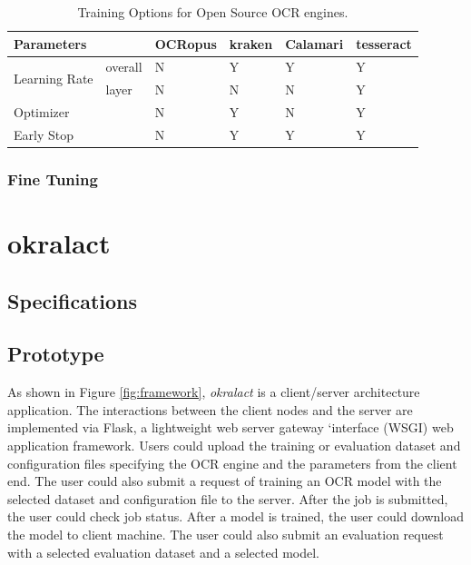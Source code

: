 \documentclass[conference]{IEEEtran}
\begin{document}
\begin{table}[bt]
\begin{tabular}{llllll}
\hline
Parameters & & OCRopus     & kraken                      & Calamari & tesseract\\ \hline
\multirow{2}{*}{Learning Rate}& overall & N & Y & Y & Y\\ 
&layer & N & N  & N & Y \\
\hline
Optimizer &  &  N & Y & N & Y \\\hline
Early Stop & & N & Y & Y & Y \\\hline
\end{tabular}
\caption{Training Options for Open Source OCR engines.}
\label{tab:training_options}
\end{table}
\subsubsection*{Fine Tuning}
\section*{okralact}

\subsection*{Specifications}


\subsection*{Prototype}     
As shown in Figure \ref{fig:framework}, \textit{okralact} is a client/server architecture application. The interactions between the client nodes and the server are implemented via Flask, a lightweight web server gateway `interface (WSGI) web application framework. Users could upload the training or evaluation dataset and configuration files specifying the OCR engine and the parameters from the client end. The user could also submit a request of training an OCR model with the selected dataset and configuration file to the server. After the job is submitted, the user could check job status. After a model is trained, the user could download the model to client machine. The user could also submit an evaluation request with a selected evaluation dataset and a selected model.
\end{document}

